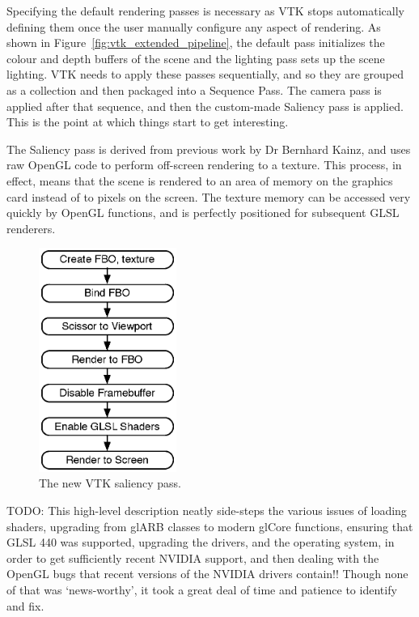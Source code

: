 \documentclass[MSc,paper=a4,pagesize=auto]{icldt}
\begin{document}
Specifying the default rendering passes is necessary as VTK stops automatically defining them once the user manually configure any aspect of rendering. As shown in Figure~\ref{fig:vtk_extended_pipeline}, the default pass initializes the colour and depth buffers of the scene and the lighting pass sets up the scene lighting. VTK needs to apply these passes sequentially, and so they are grouped as a collection and then packaged into a Sequence Pass. The camera pass is applied after that sequence, and then the custom-made Saliency pass is applied. This is the point at which things start to get interesting.

The Saliency pass is derived from previous work by Dr Bernhard Kainz, and uses raw OpenGL code to perform off-screen rendering to a texture. This process, in effect, means that the scene is rendered to an area of memory on the graphics card instead of to pixels on the screen. The texture memory can be accessed very quickly by OpenGL functions, and is perfectly positioned for subsequent GLSL renderers.

\begin{figure}[htbp!]
    \centering
    \includegraphics[width=0.4\textwidth]{resources/vtk_saliency}
    \caption{The new VTK saliency pass.}
    \label{fig:vtk_saliency}
\end{figure}

TODO: This high-level description neatly side-steps the various issues of loading shaders, upgrading from glARB classes to modern glCore functions, ensuring that GLSL 440 was supported, upgrading the drivers, and the operating system, in order to get sufficiently recent NVIDIA support, and then dealing with the OpenGL bugs that recent versions of the NVIDIA drivers contain!! Though none of that was `news-worthy', it took a great deal of time and patience to identify and fix. 
\end{document}
